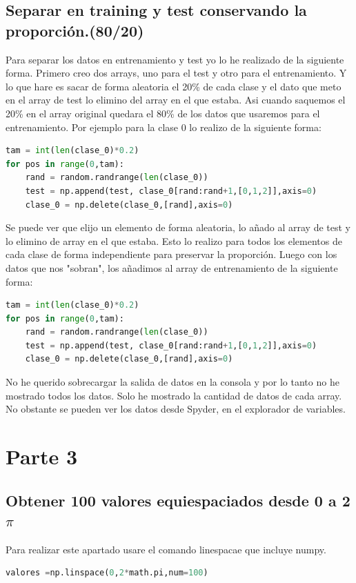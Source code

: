 \documentclass[12pt,a4paper]{article}
\begin{document}
\subsection{Separar en training y test conservando la proporción.(80/20)}
Para separar los datos en entrenamiento y test yo lo he realizado de la siguiente forma. Primero creo dos arrays, uno para el test y otro para el entrenamiento. Y lo que hare es sacar de forma aleatoria el 20\% de cada clase y el dato que meto en el array de test lo elimino del array en el que estaba. Asi cuando saquemos el 20\% en el array original quedara el 80\% de los datos que usaremos para el entrenamiento. Por ejemplo para la clase 0 lo realizo de la siguiente forma:
\begin{lstlisting}[language=Python]
tam = int(len(clase_0)*0.2)
for pos in range(0,tam):
    rand = random.randrange(len(clase_0))
    test = np.append(test, clase_0[rand:rand+1,[0,1,2]],axis=0)
    clase_0 = np.delete(clase_0,[rand],axis=0)
\end{lstlisting}
Se puede ver que elijo un elemento de forma aleatoria, lo añado al array de test y lo elimino de array en el que estaba. Esto lo realizo para todos los elementos de cada clase de forma independiente para preservar la proporción. Luego con los datos que nos "sobran", los añadimos al array de entrenamiento de la siguiente forma:
 \begin{lstlisting}[language=Python]
tam = int(len(clase_0)*0.2)
for pos in range(0,tam):
    rand = random.randrange(len(clase_0))
    test = np.append(test, clase_0[rand:rand+1,[0,1,2]],axis=0)
    clase_0 = np.delete(clase_0,[rand],axis=0)
\end{lstlisting}
No he querido sobrecargar la salida de datos en la consola y por lo tanto no he mostrado todos los datos. Solo he mostrado la cantidad de datos de cada array. No obstante se pueden ver los datos desde Spyder, en el explorador de variables.
\section{Parte 3}
\subsection{Obtener 100 valores equiespaciados desde 0 a 2$\pi$}
Para realizar este apartado usare el comando linespacae que incluye numpy.
\begin{lstlisting}[language=Python]
valores =np.linspace(0,2*math.pi,num=100)
\end{lstlisting}
\end{document}
